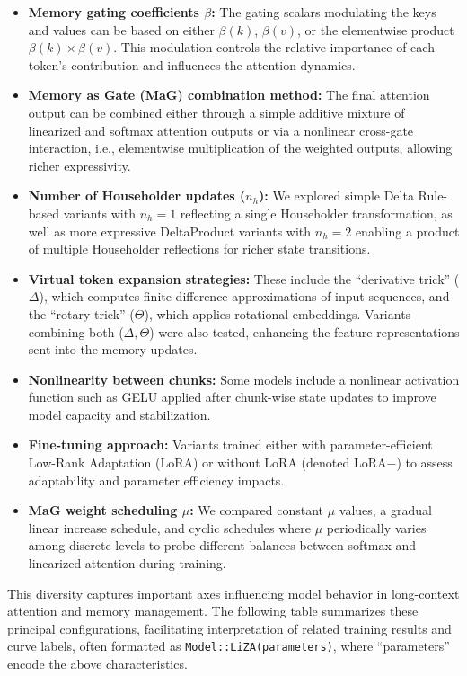 \documentclass[10pt,a4paper]{article}
\begin{document}
\begin{itemize}
    \item \textbf{Memory gating coefficients \(\beta\):} The gating scalars modulating the keys and values can be based on either \(\beta(k)\), \(\beta(v)\), or the elementwise product \(\beta(k) \times \beta(v)\). This modulation controls the relative importance of each token's contribution and influences the attention dynamics.
    \item \textbf{Memory as Gate (MaG) combination method:} The final attention output can be combined either through a simple additive mixture of linearized and softmax attention outputs or via a nonlinear cross-gate interaction, i.e., elementwise multiplication of the weighted outputs, allowing richer expressivity.
    \item \textbf{Number of Householder updates (\(n_h\)):} We explored simple Delta Rule-based variants with \(n_h=1\) reflecting a single Householder transformation, as well as more expressive DeltaProduct variants with \(n_h=2\) enabling a product of multiple Householder reflections for richer state transitions.
    \item \textbf{Virtual token expansion strategies:} These include the “derivative trick” (\(\Delta\)), which computes finite difference approximations of input sequences, and the “rotary trick” (\(\Theta\)), which applies rotational embeddings. Variants combining both (\(\Delta,\Theta\)) were also tested, enhancing the feature representations sent into the memory updates.
    \item \textbf{Nonlinearity between chunks:} Some models include a nonlinear activation function such as GELU applied after chunk-wise state updates to improve model capacity and stabilization.
    \item \textbf{Fine-tuning approach:} Variants trained either with parameter-efficient Low-Rank Adaptation (LoRA) or without LoRA (denoted LoRA\(-\)) to assess adaptability and parameter efficiency impacts.
    \item \textbf{MaG weight scheduling \(\mu\):} We compared constant \(\mu\) values, a gradual linear increase schedule, and cyclic schedules where \(\mu\) periodically varies among discrete levels to probe different balances between softmax and linearized attention during training.
\end{itemize}

This diversity captures important axes influencing model behavior in long-context attention and memory management. The following table summarizes these principal configurations, facilitating interpretation of related training results and curve labels, often formatted as \texttt{Model::LiZA(parameters)}, where “parameters” encode the above characteristics.
\end{document}
